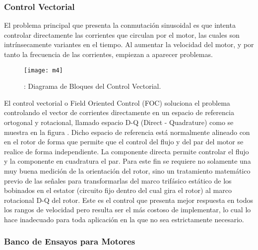 \subsubsection{Control Vectorial}
\label{subsubsection: control_vectorial}

El problema principal que presenta la conmutación sinusoidal es que intenta controlar directamente las corrientes que circulan por el motor, las cuales son intrínsecamente variantes en el tiempo. Al aumentar la velocidad del motor, y por tanto la frecuencia de las corrientes, empiezan a aparecer problemas.

\begin{figure}[h]
  \centering
  \texttt{[image: m4]}
  \caption{: Diagrama de Bloques del Control Vectorial.}\label{fig:corrientes_bobinas}
\end{figure}

El control vectorial o Field Oriented Control (FOC) soluciona el problema controlando el vector de corrientes directamente en un espacio de referencia ortogonal y rotacional, llamado espacio D-Q (Direct - Quadrature) como se muestra en la figura . Dicho
espacio de referencia está normalmente alineado con en el rotor de forma que permite que el control del flujo y del par del motor se realice de forma independiente. La componente directa permite controlar el flujo y la componente en cuadratura el par. Para este fin se requiere no solamente una muy buena medición de la orientación del rotor, sino un tratamiento matemático previo de las señales para transformarlas del marco trifásico estático de los bobinados en el estator (circuito fijo dentro del cual gira el rotor) al marco rotacional D-Q del rotor. Este es el control que presenta mejor respuesta en todos los rangos de velocidad pero resulta ser el más costoso de implementar, lo cual lo hace inadecuado para toda aplicación en la que no sea estrictamente necesario.




\pagebreak

\subsubsection{Banco de Ensayos para Motores}
\label{subsubsection: banco_ensayos}


